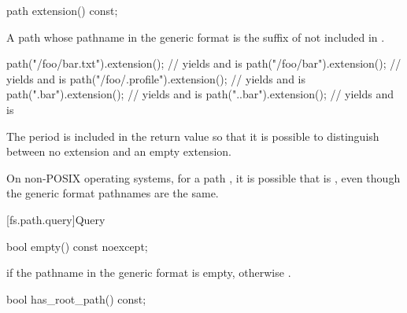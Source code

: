%
\begin{itemdecl}
path extension() const;
\end{itemdecl}

\begin{itemdescr}
\pnum
\returns
A path whose pathname in the generic format is
the suffix of  not included in .

\pnum
\begin{example}
\begin{codeblock}
path("/foo/bar.txt").extension();       // yields  and  is 
path("/foo/bar").extension();           // yields  and  is 
path("/foo/.profile").extension();      // yields  and  is 
path(".bar").extension();               // yields  and  is 
path("..bar").extension();              // yields  and  is 
\end{codeblock}
\end{example}

\pnum
\begin{note}
The period is included in the return value so that it is
  possible to distinguish between no extension and an empty extension.
\end{note}

\pnum
\begin{note}
On non-POSIX operating systems, for a path ,
it is possible that  is ,
even though the generic format pathnames are the same.
\end{note}
\end{itemdescr}

[fs.path.query]{Query}

%
\begin{itemdecl}
bool empty() const noexcept;
\end{itemdecl}

\begin{itemdescr}
\pnum
\returns
{} if the pathname in the generic format is empty, otherwise .
\end{itemdescr}

%
\begin{itemdecl}
bool has_root_path() const;
\end{itemdecl}

